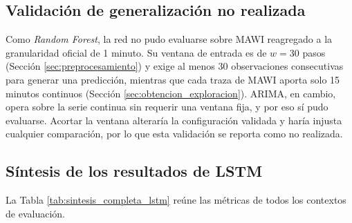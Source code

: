 \documentclass[12pt]{report}
\begin{document}
\subsection*{Validación de generalización no realizada}

Como \textit{Random Forest}, la red no pudo evaluarse sobre MAWI reagregado a la granularidad oficial de 1 minuto. Su ventana de entrada es de $w=30$ pasos (Sección \ref{sec:preprocesamiento}) y exige al menos 30 observaciones consecutivas para generar una predicción, mientras que cada traza de MAWI aporta solo 15 minutos continuos (Sección \ref{sec:obtencion_exploracion}). ARIMA, en cambio, opera sobre la serie continua sin requerir una ventana fija, y por eso sí pudo evaluarse. Acortar la ventana alteraría la configuración validada y haría injusta cualquier comparación, por lo que esta validación se reporta como no realizada.

\subsection*{Síntesis de los resultados de LSTM}

La Tabla \ref{tab:sintesis_completa_lstm} reúne las métricas de todos los contextos de evaluación.
\end{document}
